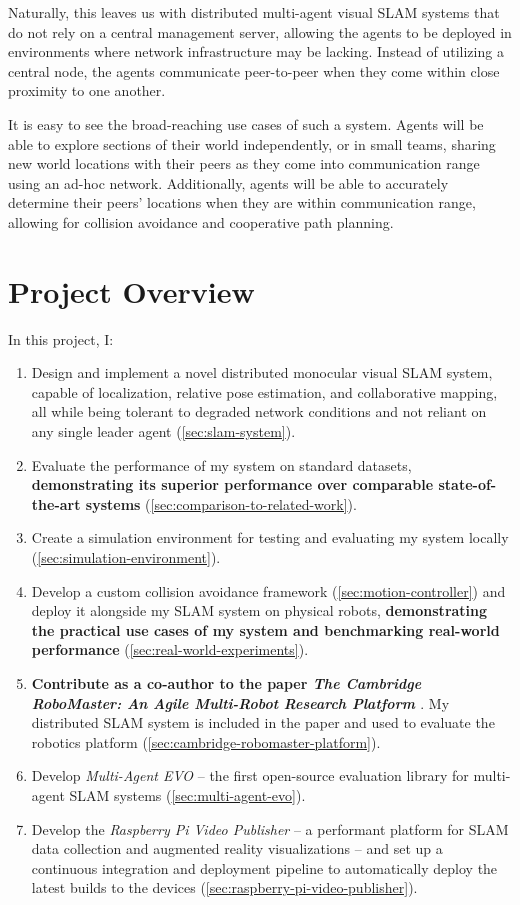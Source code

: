 Naturally, this leaves us with distributed multi-agent visual SLAM systems that do not rely on a central management server, allowing the agents to be deployed in environments where network infrastructure may be lacking. Instead of utilizing a central node, the agents communicate peer-to-peer when they come within close proximity to one another.

It is easy to see the broad-reaching use cases of such a system. Agents will be able to explore sections of their world independently, or in small teams, sharing new world locations with their peers as they come into communication range using an ad-hoc network. Additionally, agents will be able to accurately determine their peers' locations when they are within communication range, allowing for collision avoidance and cooperative path planning.

\section{Project Overview}
\label{sec:project-overview}
In this project, I: \noparskip
{
    \begin{enumerate}
        \item Design and implement a novel distributed monocular visual SLAM system, capable of localization, relative pose estimation, and collaborative mapping, all while being tolerant to degraded network conditions and not reliant on any single leader agent (\autoref{sec:slam-system}).
        \item Evaluate the performance of my system on standard datasets, \textbf{demonstrating its superior performance over comparable state-of-the-art systems} (\autoref{sec:comparison-to-related-work}).
        \item Create a simulation environment for testing and evaluating my system locally (\autoref{sec:simulation-environment}).
        \item Develop a custom collision avoidance framework (\autoref{sec:motion-controller}) and deploy it alongside my SLAM system on physical robots, \textbf{demonstrating the practical use cases of my system and benchmarking real-world performance} (\autoref{sec:real-world-experiments}).
        \item \textbf{Contribute as a co-author to the paper \textit{The Cambridge RoboMaster: An Agile Multi-Robot Research Platform} \autocite{blumenkamp2024cambridge}}. My distributed SLAM system is included in the paper and used to evaluate the robotics platform (\autoref{sec:cambridge-robomaster-platform}).
        \item Develop \textit{Multi-Agent EVO} – the first open-source evaluation library for multi-agent SLAM systems (\autoref{sec:multi-agent-evo}).
        \item Develop the \textit{Raspberry Pi Video Publisher} – a performant platform for SLAM data collection and augmented reality visualizations – and set up a continuous integration and deployment pipeline to automatically deploy the latest builds to the devices (\autoref{sec:raspberry-pi-video-publisher}).
    \end{enumerate}
}


